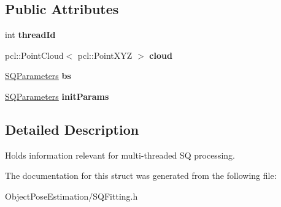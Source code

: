 \subsection*{Public Attributes}
\begin{DoxyCompactItemize}
\item 
\hypertarget{structope_1_1_s_q_fitting_thread_info_a54bcc2b4e2fe96df630d334a7843d7db}{int {\bfseries thread\-Id}}\label{structope_1_1_s_q_fitting_thread_info_a54bcc2b4e2fe96df630d334a7843d7db}

\item 
\hypertarget{structope_1_1_s_q_fitting_thread_info_af62511b3802eb93fff3fe3a9dc390f42}{pcl\-::\-Point\-Cloud$<$ pcl\-::\-Point\-X\-Y\-Z $>$ {\bfseries cloud}}\label{structope_1_1_s_q_fitting_thread_info_af62511b3802eb93fff3fe3a9dc390f42}

\item 
\hypertarget{structope_1_1_s_q_fitting_thread_info_aeb8608a9bb1b24a982c5f6b8fdce108d}{\hyperlink{classope_1_1_s_q_parameters}{S\-Q\-Parameters} {\bfseries bs}}\label{structope_1_1_s_q_fitting_thread_info_aeb8608a9bb1b24a982c5f6b8fdce108d}

\item 
\hypertarget{structope_1_1_s_q_fitting_thread_info_a2f444abf69a047aa8aae5b260399c0d9}{\hyperlink{classope_1_1_s_q_parameters}{S\-Q\-Parameters} {\bfseries init\-Params}}\label{structope_1_1_s_q_fitting_thread_info_a2f444abf69a047aa8aae5b260399c0d9}

\end{DoxyCompactItemize}


\subsection{Detailed Description}
Holds information relevant for multi-\/threaded S\-Q processing. 

The documentation for this struct was generated from the following file\-:\begin{DoxyCompactItemize}
\item 
Object\-Pose\-Estimation/S\-Q\-Fitting.\-h\end{DoxyCompactItemize}
